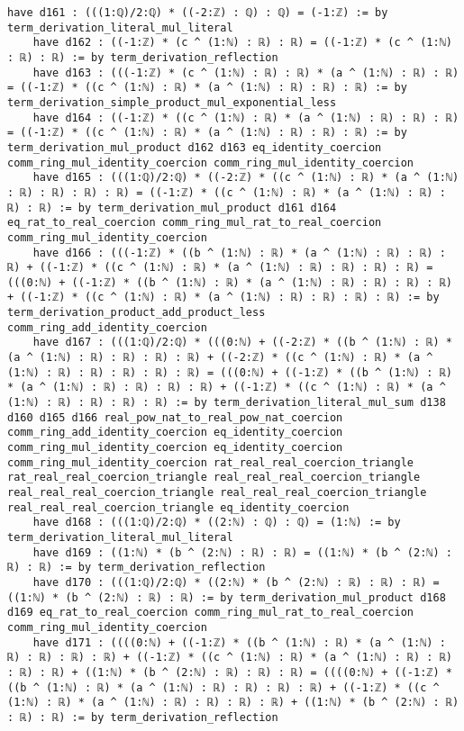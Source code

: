 \documentclass{article}
\begin{document}
\begin{tcolorbox}[colback=white!10, width=\linewidth]
\begin{lstlisting}[language=Lean4]
    have d161 : (((1:ℚ)/2:ℚ) * ((-2:ℤ) : ℚ) : ℚ) = (-1:ℤ) := by term_derivation_literal_mul_literal
    have d162 : ((-1:ℤ) * (c ^ (1:ℕ) : ℝ) : ℝ) = ((-1:ℤ) * (c ^ (1:ℕ) : ℝ) : ℝ) := by term_derivation_reflection
    have d163 : (((-1:ℤ) * (c ^ (1:ℕ) : ℝ) : ℝ) * (a ^ (1:ℕ) : ℝ) : ℝ) = ((-1:ℤ) * ((c ^ (1:ℕ) : ℝ) * (a ^ (1:ℕ) : ℝ) : ℝ) : ℝ) := by term_derivation_simple_product_mul_exponential_less
    have d164 : ((-1:ℤ) * ((c ^ (1:ℕ) : ℝ) * (a ^ (1:ℕ) : ℝ) : ℝ) : ℝ) = ((-1:ℤ) * ((c ^ (1:ℕ) : ℝ) * (a ^ (1:ℕ) : ℝ) : ℝ) : ℝ) := by term_derivation_mul_product d162 d163 eq_identity_coercion comm_ring_mul_identity_coercion comm_ring_mul_identity_coercion
    have d165 : (((1:ℚ)/2:ℚ) * ((-2:ℤ) * ((c ^ (1:ℕ) : ℝ) * (a ^ (1:ℕ) : ℝ) : ℝ) : ℝ) : ℝ) = ((-1:ℤ) * ((c ^ (1:ℕ) : ℝ) * (a ^ (1:ℕ) : ℝ) : ℝ) : ℝ) := by term_derivation_mul_product d161 d164 eq_rat_to_real_coercion comm_ring_mul_rat_to_real_coercion comm_ring_mul_identity_coercion
    have d166 : (((-1:ℤ) * ((b ^ (1:ℕ) : ℝ) * (a ^ (1:ℕ) : ℝ) : ℝ) : ℝ) + ((-1:ℤ) * ((c ^ (1:ℕ) : ℝ) * (a ^ (1:ℕ) : ℝ) : ℝ) : ℝ) : ℝ) = (((0:ℕ) + ((-1:ℤ) * ((b ^ (1:ℕ) : ℝ) * (a ^ (1:ℕ) : ℝ) : ℝ) : ℝ) : ℝ) + ((-1:ℤ) * ((c ^ (1:ℕ) : ℝ) * (a ^ (1:ℕ) : ℝ) : ℝ) : ℝ) : ℝ) := by term_derivation_product_add_product_less comm_ring_add_identity_coercion
    have d167 : (((1:ℚ)/2:ℚ) * (((0:ℕ) + ((-2:ℤ) * ((b ^ (1:ℕ) : ℝ) * (a ^ (1:ℕ) : ℝ) : ℝ) : ℝ) : ℝ) + ((-2:ℤ) * ((c ^ (1:ℕ) : ℝ) * (a ^ (1:ℕ) : ℝ) : ℝ) : ℝ) : ℝ) : ℝ) = (((0:ℕ) + ((-1:ℤ) * ((b ^ (1:ℕ) : ℝ) * (a ^ (1:ℕ) : ℝ) : ℝ) : ℝ) : ℝ) + ((-1:ℤ) * ((c ^ (1:ℕ) : ℝ) * (a ^ (1:ℕ) : ℝ) : ℝ) : ℝ) : ℝ) := by term_derivation_literal_mul_sum d138 d160 d165 d166 real_pow_nat_to_real_pow_nat_coercion comm_ring_add_identity_coercion eq_identity_coercion comm_ring_mul_identity_coercion eq_identity_coercion comm_ring_mul_identity_coercion rat_real_real_coercion_triangle rat_real_real_coercion_triangle real_real_real_coercion_triangle real_real_real_coercion_triangle real_real_real_coercion_triangle real_real_real_coercion_triangle eq_identity_coercion
    have d168 : (((1:ℚ)/2:ℚ) * ((2:ℕ) : ℚ) : ℚ) = (1:ℕ) := by term_derivation_literal_mul_literal
    have d169 : ((1:ℕ) * (b ^ (2:ℕ) : ℝ) : ℝ) = ((1:ℕ) * (b ^ (2:ℕ) : ℝ) : ℝ) := by term_derivation_reflection
    have d170 : (((1:ℚ)/2:ℚ) * ((2:ℕ) * (b ^ (2:ℕ) : ℝ) : ℝ) : ℝ) = ((1:ℕ) * (b ^ (2:ℕ) : ℝ) : ℝ) := by term_derivation_mul_product d168 d169 eq_rat_to_real_coercion comm_ring_mul_rat_to_real_coercion comm_ring_mul_identity_coercion
    have d171 : ((((0:ℕ) + ((-1:ℤ) * ((b ^ (1:ℕ) : ℝ) * (a ^ (1:ℕ) : ℝ) : ℝ) : ℝ) : ℝ) + ((-1:ℤ) * ((c ^ (1:ℕ) : ℝ) * (a ^ (1:ℕ) : ℝ) : ℝ) : ℝ) : ℝ) + ((1:ℕ) * (b ^ (2:ℕ) : ℝ) : ℝ) : ℝ) = ((((0:ℕ) + ((-1:ℤ) * ((b ^ (1:ℕ) : ℝ) * (a ^ (1:ℕ) : ℝ) : ℝ) : ℝ) : ℝ) + ((-1:ℤ) * ((c ^ (1:ℕ) : ℝ) * (a ^ (1:ℕ) : ℝ) : ℝ) : ℝ) : ℝ) + ((1:ℕ) * (b ^ (2:ℕ) : ℝ) : ℝ) : ℝ) := by term_derivation_reflection

\end{lstlisting}
\end{tcolorbox}
\end{document}
